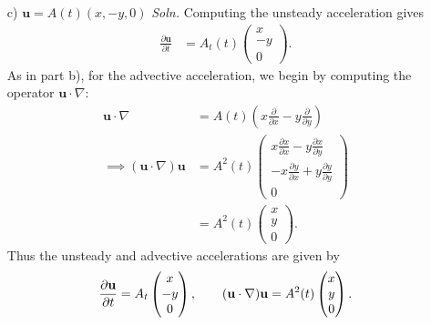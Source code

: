 \documentclass{article}
\begin{document}
\begin{itemize}
\begin{itemize}
        \item[c)] $\mathbf{u} = A(t)(x,-y,0)$
        \newline\newline
        \textit{Soln.} Computing the unsteady acceleration gives
        \begin{align*}
            \frac{\partial \mathbf{u}}{\partial t} &= A_t(t)\begin{pmatrix}
                x\\
                -y\\
                0
            \end{pmatrix}.
        \end{align*}
        As in part b), for the advective acceleration, we begin by computing the operator $\mathbf{u}\cdot \nabla$:
        \begin{align*}
            \mathbf{u}\cdot\nabla &= A(t)\left(x\frac{\partial}{\partial x} - y\frac{\partial }{\partial y}\right)\\
            \implies (\mathbf{u}\cdot\nabla)\mathbf{u} &= A^2(t)\begin{pmatrix}
                x\frac{\partial x}{\partial x} - y\frac{\partial x}{\partial y}\\
                -x\frac{\partial y}{\partial x} + y\frac{\partial y}{\partial y}\\
                0
            \end{pmatrix}\\
            &=A^2(t) \begin{pmatrix}
                x\\
                y\\
                0
            \end{pmatrix}.
        \end{align*}
        Thus the unsteady and advective accelerations are given by
        \[\frac{\partial \mathbf{u}}{\partial t} = A_t\begin{pmatrix}
            x\\
            -y\\
            0
        \end{pmatrix}, \hspace{0.7cm} (\mathbf{u}\cdot\nabla)\mathbf{u} = A^2(t)\begin{pmatrix}
            x\\
            y\\
            0
        \end{pmatrix}.\]


\end{itemize}
\end{itemize}
\end{document}
